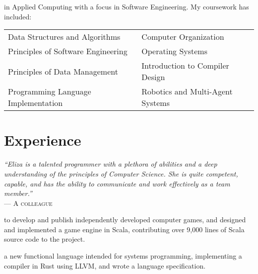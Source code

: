 \documentclass[a4paper]{tufte-handout}
\begin{document}
 in Applied Computing with a focus in Software Engineering. My coursework has included: \\
    {\footnotesize
    \begin{tabular}{l l}
    Data Structures and Algorithms  & Computer Organization \\
    Principles of Software Engineering & Operating Systems\\
    Principles of Data Management & Introduction to Compiler Design\\
    Programming Language Implementation & Robotics and Multi-Agent Systems\\
\end{tabular} }

\section{Experience}
    {\begingroup\footnotesize
    \emph{``Eliza is a talented programmer with a plethora of abilities and a deep understanding of the principles of Computer Science. She is quite competent, capable, and has the ability to communicate and work effectively as a team member.''}\\
    --- \textsc{A colleague}\endgroup}

 to develop and publish independently developed computer games, and designed and implemented a game engine in Scala, contributing over 9,000 lines of Scala source code to the project.

 a new functional language intended for systems programming, implementing a compiler in Rust using LLVM, and wrote a language specification.
\end{document}
